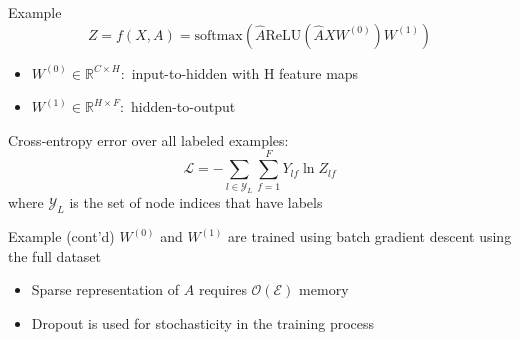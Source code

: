 \documentclass{beamer}
\begin{document}
\begin{frame}{Example}
  \[
  Z=f(X,A)=\text{softmax}\left(\hat{A}\text{ReLU}\left(\hat{A}XW^{(0)}\right)W^{(1)}\right)
  \]
  \begin{itemize}
  \item $W^{(0)} \in \mathbb{R}^{C \times H}:$ input-to-hidden with H feature maps
  \item $W^{(1)} \in \mathbb{R}^{H \times F}:$ hidden-to-output
  \end{itemize}
  Cross-entropy error over all labeled examples:
  \[
  \mathcal{L} =-\sum_{l \in \mathcal{Y}_L}^{}{\sum_{f=1}^{F}{Y_{lf}\ln{Z_{lf}}}}
  \]
  where $\mathcal{Y}_L$ is the set of node indices that have labels
\end{frame}
\begin{frame}{Example (cont'd)}
  $W^{(0)}$ and $W^{(1)}$ are trained using batch gradient descent using the full dataset
  \begin{itemize}
  \item Sparse representation of $A$ requires $\mathcal{O}(\mathcal{E})$ memory
  \item Dropout is used for stochasticity in the training process
  \end{itemize}
\end{frame}
\end{document}
